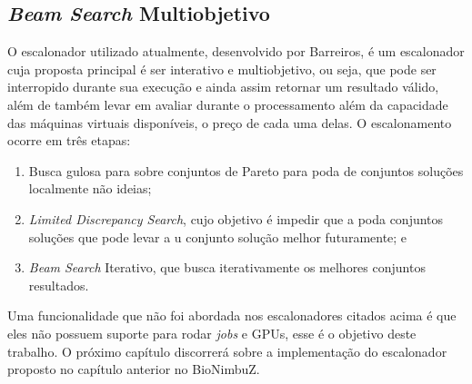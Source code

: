 \subsection{\textit{Beam Search} Multiobjetivo}
O escalonador utilizado atualmente, desenvolvido por Barreiros\cite{BioNimbuZ_Willian_C99}, é um escalonador cuja proposta principal é ser interativo e multiobjetivo, ou seja, que pode ser interropido durante sua execução e ainda assim retornar um resultado válido, além de também levar em avaliar durante o processamento além da capacidade das máquinas virtuais disponíveis, o preço de cada uma delas. O escalonamento ocorre em três etapas:
\begin{enumerate}
	\item Busca gulosa para sobre conjuntos de Pareto para poda de conjuntos soluções localmente não ideias;
	\item \textit{Limited Discrepancy Search}, cujo objetivo é impedir que a poda conjuntos soluções que pode levar a u conjunto solução melhor futuramente; e
	\item \textit{Beam Search} Iterativo, que busca iterativamente os melhores conjuntos resultados.
\end{enumerate}

Uma funcionalidade que não foi abordada nos escalonadores citados acima é que eles não possuem suporte para rodar \textit{jobs} e \acrshort{GPU}s, esse é o objetivo deste trabalho. O próximo capítulo discorrerá sobre a implementação do escalonador proposto no capítulo anterior no BioNimbuZ.